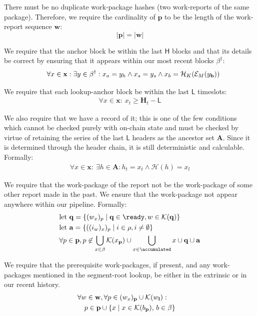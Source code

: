 There must be no duplicate work-package hashes (\ie two work-reports of the same package). Therefore, we require the cardinality of $\mathbf{p}$ to be the length of the work-report sequence $\mathbf{w}$:
\begin{equation}
  |\mathbf{p}| = |\mathbf{w}|
\end{equation}

We require that the anchor block be within the last $\mathsf{H}$ blocks and that its details be correct by ensuring that it appears within our most recent blocks $\beta^\dagger$:
\begin{align}
  \forall x \in \mathbf{x} : \exists y \in \beta^\dagger : x_a = y_h \wedge x_s = y_s \wedge x_b = \mathcal{H}_K(\mathcal{E}_M(y_\mathbf{b}))\!\!\!\!\!\!
\end{align}

We require that each lookup-anchor block be within the last $\mathsf{L}$ timeslots:
\begin{align}
  \forall x \in \mathbf{x} :\ x_t \ge \mathbf{H}_t - \mathsf{L}
\end{align}

We also require that we have a record of it; this is one of the few conditions which cannot be checked purely with on-chain state and must be checked by virtue of retaining the series of the last $\mathsf{L}$ headers as the ancestor set $\mathbf{A}$. Since it is determined through the header chain, it is still deterministic and calculable. Formally:
\begin{align}
  \forall x \in \mathbf{x} :\ \exists h \in \mathbf{A}: h_t = x_t \wedge \mathcal{H}(h) = x_l
\end{align}

We require that the work-package of the report not be the work-package of some other report made in the past. We ensure that the work-package not appear anywhere within our pipeline. Formally:
\begin{align}
  &\using \mathbf{q} = \{(w_x)_p \mid \mathbf{q} \in \ready, w \in \keys{\mathbf{q}}\} \\
  &\using \mathbf{a} = \{((i_w)_x)_p \mid i \in \rho, i \ne \none\}\\
  &\forall p \in \mathbf{p}, p \not\in \bigcup_{x \in \beta}\keys{x_\mathbf{p}} \cup \bigcup_{x \in \accumulated}x \cup \mathbf{q} \cup \mathbf{a}
\end{align}

We require that the prerequisite work-packages, if present, and any work-packages mentioned in the segment-root lookup, be either in the extrinsic or in our recent history.
\begin{align}
  &\begin{aligned}
    &\forall w \in \mathbf{w}, \forall p \in (w_x)_\mathbf{p} \cup \mathcal{K}(w_\mathbf{l}) :\\
    &\quad p \in \mathbf{p} \cup \{ x \mid x \in \mathcal{K}(b_\mathbf{p}) ,\, b \in \beta \}
  \end{aligned}
\end{align}

